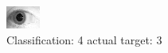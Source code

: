 \begin{figure}[h!]
\begin{center}
\includegraphics[width=0.60\columnwidth]{figures/ID1820_class_4_target_3.png}
\end{center}
\caption{ Classification: 4 actual target: 3}
\label{fig:ID1820_class_4_target_3}
\end{figure}
